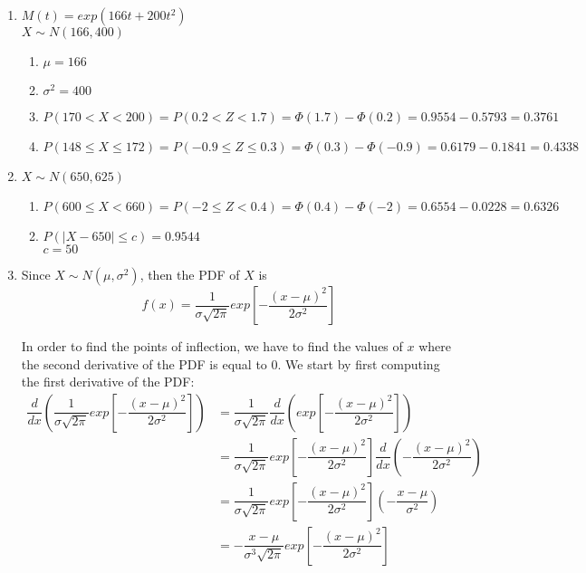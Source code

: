 \documentclass{article}
\begin{document}
\begin{enumerate}
     \item
      $M(t) = exp(166t + 200t^2)$ \\
      $X \sim N(166, 400)$
      \begin{enumerate}
       \item
	$\mu = 166$
       
       \item
	$\sigma^2 = 400$
       
       \item
	$P(170 < X < 200) = P(0.2 < Z < 1.7) = \Phi(1.7) - \Phi(0.2) 
	    = 0.9554 - 0.5793 = 0.3761$
       
       \item
	$P(148 \le X \le 172) = P(-0.9 \le Z \le 0.3) = \Phi(0.3) - \Phi(-0.9) 
	    = 0.6179 - 0.1841 = 0.4338$
      \end{enumerate}
     
     \item
      $X \sim N(650, 625)$
      \begin{enumerate}
       \item 
	$P(600 \le X < 660) = P(-2 \le Z < 0.4) = \Phi(0.4) - \Phi(-2) = 0.6554 - 0.0228 = 0.6326$
       
       \item
	$P(|X - 650| \le c) = 0.9544$ \\
	$c = 50$
      \end{enumerate}
     
     \item
      Since $X \sim N(\mu, \sigma^2)$, then the PDF of $X$ is 
	$$f(x) = \dfrac{1}{\sigma \sqrt{2\pi}} exp\left[-\dfrac{(x-\mu)^2}{2\sigma^2}\right]$$
	
      In order to find the points of inflection, we have to find the values of $x$ where the second 
      derivative of the PDF is equal to 0. We start by first computing the first derivative of 
      the PDF:
	\begin{align*}
	  \dfrac{d}{dx}\left(\dfrac{1}{\sigma \sqrt{2\pi}} exp\left[-\dfrac{(x-\mu)^2}{2\sigma^2}\right]\right) 
	    &=\dfrac{1}{\sigma\sqrt{2\pi}} \dfrac{d}{dx}\left(exp\left[-\dfrac{(x-\mu)^2}{2\sigma^2}\right]\right) \\
	  &=\dfrac{1}{\sigma\sqrt{2\pi}} exp\left[-\dfrac{(x-\mu)^2}{2\sigma^2}\right] 
		    \dfrac{d}{dx}\left(-\dfrac{(x-\mu)^2}{2\sigma^2}\right)\\
	  &=\dfrac{1}{\sigma\sqrt{2\pi}} exp\left[-\dfrac{(x-\mu)^2}{2\sigma^2}\right] 
		    \left(-\dfrac{x-\mu}{\sigma^2}\right)\\
	  &=-\dfrac{x-\mu}{\sigma^3\sqrt{2\pi}} exp\left[-\dfrac{(x-\mu)^2}{2\sigma^2}\right] \\
	\end{align*}
	

\end{enumerate}
\end{document}
